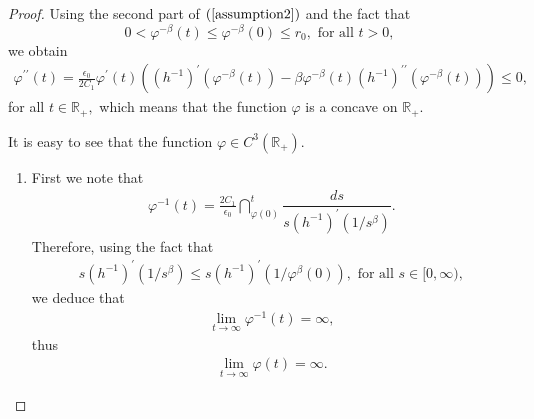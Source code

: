 \documentclass[11pt,reqno]{amsart}
\theoremstyle{plain}
\numberwithin{equation}{section}
\numberwithin{equation}{section}
\begin{document}
\begin{proof}
Using the second part of $\left( \ref{assumption2}\right) $ and the fact that%
\begin{equation}
0<\varphi ^{-\beta }\left( t\right) \leq \varphi ^{-\beta }\left( 0\right)
\leq r_{0},\text{ for all }t>0,  \label{phi t beta bound}
\end{equation}%
we obtain%
\begin{equation}
\begin{array}{c}
\varphi ^{\prime \prime }\left( t\right) =\frac{\epsilon _{0}}{2C_{1}}%
\varphi ^{\prime }\left( t\right) \left( \left( h^{-1}\right) ^{\prime
}\left( \varphi ^{-\beta }\left( t\right) \right) -\beta \varphi ^{-\beta
}\left( t\right) \left( h^{-1}\right) ^{\prime \prime }\left( \varphi
^{-\beta }\left( t\right) \right) \right) \leq 0,%
\end{array}
\label{concave phi}
\end{equation}%
for all $t\in 
\mathbb{R}
_{+},$ which means that the function $\varphi $ is a concave on $%
\mathbb{R}
_{+}.$

It is easy to see that the function $\varphi \in C^{3}\left( 
\mathbb{R}
_{+}\right) $.

\begin{enumerate}
\item First we note that 
\begin{equation*}
\begin{array}{c}
\varphi ^{-1}\left( t\right) =\frac{2C_{1}}{\epsilon _{0}}\dint_{\varphi
\left( 0\right) }^{t}\dfrac{ds}{s\left( h^{-1}\right) ^{\prime }\left(
1/s^{\beta }\right) }.%
\end{array}%
\end{equation*}%
Therefore, using the fact that%
\begin{equation*}
\begin{array}{c}
s\left( h^{-1}\right) ^{\prime }\left( 1/s^{\beta }\right) \leq s\left(
h^{-1}\right) ^{\prime }\left( 1/\varphi ^{\beta }\left( 0\right) \right) ,%
\text{ for all }s\in \lbrack 0,\infty ),%
\end{array}%
\end{equation*}%
we deduce that%
\begin{equation*}
\begin{array}{c}
\underset{t\rightarrow \infty }{\lim }\varphi ^{-1}\left( t\right) =\infty ,%
\end{array}%
\end{equation*}%
thus 
\begin{equation}
\begin{array}{c}
\underset{t\rightarrow \infty }{\lim }\varphi \left( t\right) =\infty .%
\end{array}
\label{limit phi}
\end{equation}


\end{enumerate}
\end{proof}
\end{document}
